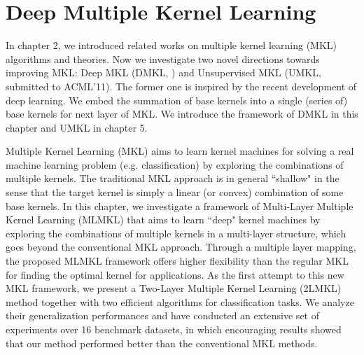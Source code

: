 \def\k{{\mathcal K}}
\def\h{{\mathcal H}}
\def\x{{\bf x}}
\def\d{{\bf d}}
\def\K{{\bf K}}
\def\M{{\bf M}}
\def\I{{\bf I}}
\def\U{{\bf U}}
\def\u{{\bf u}}
\def\v{{\bf v}}
\def\a{{\alpha}}
\def\ba{{\bm\alpha}}
\def\eu{{\widehat{\u}_n}}
\def\1{{\bf 1}}
\def\0{{\bf 0}}
\def\y{{\bf y}}
\def\X{{\mathbf X}}
\def\D{{\mathbf D}}
\def\conv{{\mbox{conv}}}
\def\rk{{\mbox{r}}}
\def\r{{\mathbb R}}
\def\e{{\mathbb E}}
\def\p{{\mathbb P}}
\def\n{{\mathbb N}}
\chapter{Deep Multiple Kernel Learning}

In chapter 2, we introduced related works on multiple kernel learning (MKL) algorithms and theories. Now we investigate two novel directions towards improving MKL: Deep MKL (DMKL, \cite{aistats/ZhuangTH11}) and Unsupervised MKL (UMKL, submitted to ACML'11). The former one is inspired by the recent development of deep learning\cite{neco/HintonOT06}\cite{ftml/Bengio09}\cite{nips/ChoS09}. We embed the summation of base kernels into a single (series of) base kernels for next layer of MKL. We introduce the framework of DMKL in this chapter and UMKL in chapter 5.

Multiple Kernel Learning (MKL) aims to learn kernel machines for solving a real machine learning problem (e.g. classification) by exploring the combinations of multiple kernels.
The traditional MKL approach is in general ``shallow" in the sense that the target kernel is simply a linear (or convex) combination of some base kernels. In this chapter, we investigate a framework of Multi-Layer Multiple Kernel Learning (MLMKL) that aims to learn ``deep" kernel machines by exploring the combinations of multiple kernels in a multi-layer structure, which goes beyond the conventional MKL approach. Through a multiple layer mapping, the proposed MLMKL framework offers higher flexibility than the regular MKL for finding the optimal kernel for applications. As the first attempt to this new MKL framework, we present a Two-Layer Multiple Kernel Learning (2LMKL) method together with two efficient algorithms for classification tasks. We analyze their generalization performances and have conducted an extensive set of experiments over 16 benchmark datasets, in which encouraging results showed that our method performed better than the conventional MKL methods.

